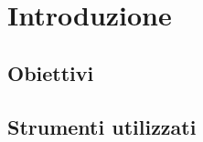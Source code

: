 \chapter*{Introduzione}
\fancyfoot[C]{\thepage } 
\section* {Obiettivi}
\section* {Strumenti utilizzati}
